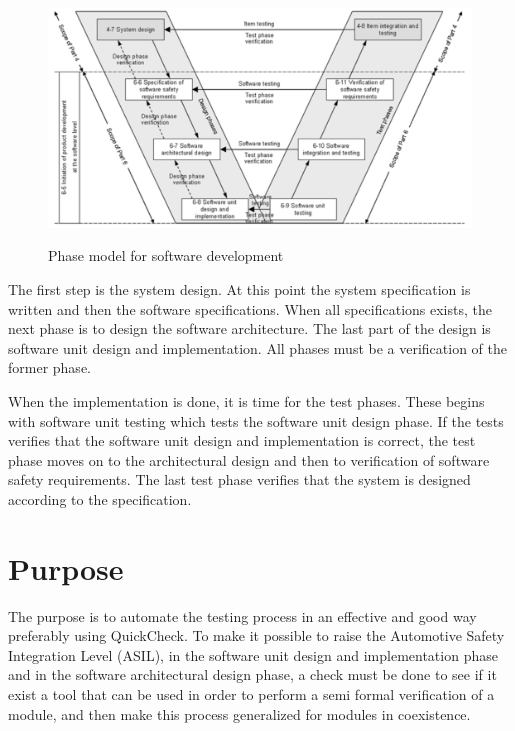 \begin{figure}[!ht]
  \includegraphics[keepaspectratio, width=\linewidth]{pictures/V}
  \label{IMG:phase_model}
  \caption{Phase model for software development}
\end{figure}

The first step is the system design. At this point the system specification is
written and then the software specifications. When all
specifications exists, the next phase is to design the software architecture.
The last part of the design is software unit design and implementation. All
phases must be a verification of the former phase.

When the implementation is done, it is time for the test phases. These begins
with software unit testing which tests the software unit design phase. If the
tests verifies that the software unit design and implementation is correct, the
test phase moves on to the architectural design and then to verification of
software safety requirements.
The last test phase verifies that the system is
designed according to the specification. %

\section{Purpose}
The purpose is to automate the testing process in an effective and good way
preferably using QuickCheck. To make it possible to raise the Automotive Safety
Integration Level (ASIL), in the software unit design and implementation phase
and in the software architectural design phase, a check must be done to see if
it exist a tool that can be used in order to perform a semi formal verification
of a module, and then make this process generalized for modules in
coexistence.\\

